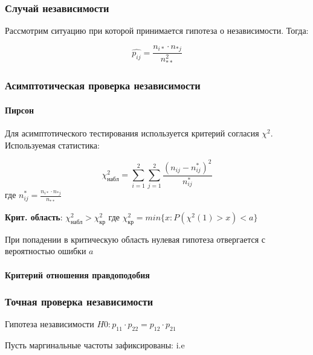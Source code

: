 \documentclass{article}
\begin{document}
    \subsubsection{Случай независимости}

    Рассмотрим ситуацию при которой принимается гипотеза о независимости. Тогда:

    \begin{equation}
        \widehat{p_{ij}} = \frac{n_{i*} \cdot n_{*j}}{n_{**}^2}
    \end{equation}


    \subsubsection{Асимптотическая проверка независимости}

    \paragraph{Пирсон}

    Для асимптотического тестирования используется критерий согласия $\chi^2$. Используемая статистика:

    \begin{equation}
        \chi^2_{набл} = \sum_{i=1}^{2}{\sum_{j=1}^{2}{ \frac{( n_{ij} - n_{ij}^{*} )^{2}}{ n_{ij}^{*} } }}
    \end{equation}
    где $n_{ij}^{*} = \frac{n_{i*} \cdot n_{*j}}{n_{**}}$
    
    \textbf{Крит. область}: $\chi^2_{\text{набл}} > \chi^2_{\text{кр}}$ где $\chi^2_{\text{кр}} =
    min\{x: P(\chi^2(1) > x) < a  \}$

    При попадении в критическую область нулевая гипотеза отвергается с вероятностью ошибки $a$

    

    \paragraph{Критерий отношения правдоподобия}

    
    \subsubsection{Точная проверка независимости}

    Гипотеза независимости $H0: p_{11} \cdot p_{22} = p_{12} \cdot p_{21}$

    Пусть маргинальные частоты зафиксированы: i.e $$
\end{document}
